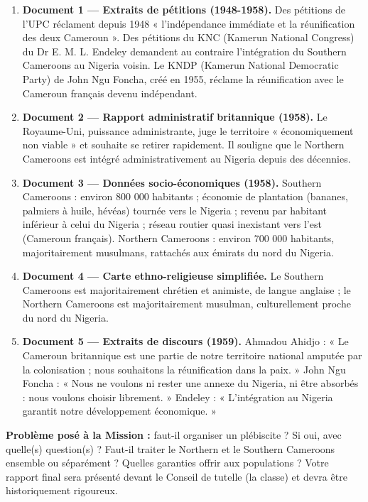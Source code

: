 \documentclass[11pt]{article}
\newcommand{\cle}[1]{{\popxbold\color{popdark}#1}}
\begin{document}
\begin{enumerate}
\item \textbf{Document 1 — Extraits de pétitions (1948-1958).} Des pétitions de l'UPC réclament depuis 1948 « l'indépendance immédiate et la réunification des deux Cameroun ». Des pétitions du KNC (Kamerun National Congress) du Dr \cle{E. M. L. Endeley} demandent au contraire l'intégration du Southern Cameroons au Nigeria voisin. Le KNDP (Kamerun National Democratic Party) de \cle{John Ngu Foncha}, créé en 1955, réclame la réunification avec le Cameroun français devenu indépendant.
\item \textbf{Document 2 — Rapport administratif britannique (1958).} Le Royaume-Uni, puissance administrante, juge le territoire « économiquement non viable » et souhaite se retirer rapidement. Il souligne que le Northern Cameroons est intégré administrativement au Nigeria depuis des décennies.
\item \textbf{Document 3 — Données socio-économiques (1958).} Southern Cameroons : environ 800 000 habitants ; économie de plantation (bananes, palmiers à huile, hévéas) tournée vers le Nigeria ; revenu par habitant inférieur à celui du Nigeria ; réseau routier quasi inexistant vers l'est (Cameroun français). Northern Cameroons : environ 700 000 habitants, majoritairement musulmans, rattachés aux émirats du nord du Nigeria.
\item \textbf{Document 4 — Carte ethno-religieuse simplifiée.} Le Southern Cameroons est majoritairement chrétien et animiste, de langue anglaise ; le Northern Cameroons est majoritairement musulman, culturellement proche du nord du Nigeria.
\item \textbf{Document 5 — Extraits de discours (1959).} Ahmadou Ahidjo : « Le Cameroun britannique est une partie de notre territoire national amputée par la colonisation ; nous souhaitons la réunification dans la paix. » John Ngu Foncha : « Nous ne voulons ni rester une annexe du Nigeria, ni être absorbés : nous voulons choisir librement. » Endeley : « L'intégration au Nigeria garantit notre développement économique. »
\end{enumerate}

\textbf{Problème posé à la Mission :} faut-il organiser un plébiscite ? Si oui, avec quelle(s) question(s) ? Faut-il traiter le Northern et le Southern Cameroons ensemble ou séparément ? Quelles garanties offrir aux populations ? Votre rapport final sera présenté devant le Conseil de tutelle (la classe) et devra être historiquement rigoureux.
\end{document}
